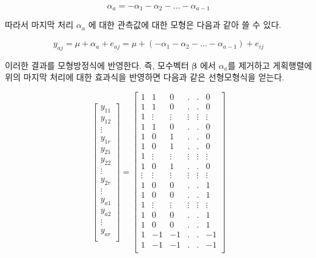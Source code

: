 \documentclass[
  10pt,
]{book}
\theoremstyle{definition}
\theoremstyle{definition}
\theoremstyle{definition}
\theoremstyle{definition}
\theoremstyle{remark}
\begin{document}
\[ \alpha_a = -\alpha_1 - \alpha_2 - \dots - \alpha_{a-1} \]

따라서 마지막 처리 \(\alpha_a\) 에 대한 관측값에 대한 모형은 다음과 같아 쓸 수 있다.

\[ y_{aj} = \mu + \alpha_a + e_{aj} = \mu +( -\alpha_1 - \alpha_2 - \dots - \alpha_{a-1}) + e_{ij} \]

이러한 결과를 모형방정식에 반영한다. 즉, 모수벡터 \(\bm \beta\) 에서 \(\alpha_a\)를 제거하고 게획행렬에 위의 마지막 처리에 대한 효과식을 반영하면 다음과 같은 선형모형식을 얻는다.

\begin{equation}
\begin{bmatrix}
y_{11} \\
y_{12} \\
\vdots \\
y_{1r} \\
y_{21} \\
y_{22} \\
\vdots \\
y_{2r} \\
\vdots \\
y_{a1} \\
y_{a2} \\
\vdots \\
y_{ar} \\
\end{bmatrix} 
 =
\begin{bmatrix}
1 & 1 & 0 & . & . & 0 \\
1 & 1 & 0 & . & . & 0 \\
1 & \vdots & \vdots & \vdots & \vdots & \vdots \\
1 & 1 & 0 & . & . & 0 \\
1 & 0 & 1 & . & . & 0 \\
1 & 0 & 1 & . & . & 0 \\
1 & \vdots & \vdots & \vdots & \vdots & \vdots \\
1 & 0 & 1 & . & . & 0 \\
\vdots & \vdots & \vdots & \vdots & \vdots & \vdots \\
1 & 0 & 0 & . & . & 1 \\
1 & 0 & 0 & . & . & 1 \\
1 & \vdots & \vdots & \vdots & \vdots & \vdots \\
1 & 0 & 0 & . & . & 1 \\
1 & 0 & 0 & . & . & 1 \\
1 & -1 & -1 & . & . & -1 \\
1 & -1 & -1 & . & . & -1 \\

\end{bmatrix}
\end{equation}
\end{document}
